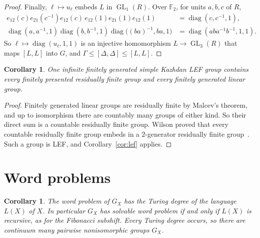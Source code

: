 \documentclass[11pt]{amsart}
\newtheorem{corollary}[theorem]{Corollary}
\newcommand{\F}{\mathbb F}
\newcommand{\GL}{\operatorname{GL}}
\begin{document}
\begin{proof}
Finally, $\ell\mapsto u_\ell$ embeds $L$ in $\GL_1(R)$. Over $\F_2$, for
units $a,b,c$ of $R$,
\[
 \begin{aligned}
 e_{12}(c)e_{21}(c^{-1})e_{12}(c)\,e_{12}(1)e_{21}(1)e_{12}(1)
 &=\operatorname{diag}(c,c^{-1},1),\\
 \operatorname{diag}(a,a^{-1},1)\operatorname{diag}(b,b^{-1},1)
 \operatorname{diag}\bigl((ba)^{-1},ba,1\bigr)
 &=\operatorname{diag}(aba^{-1}b^{-1},1,1).
 \end{aligned}
\]
So $\ell\mapsto\operatorname{diag}(u_\ell,1,1)$ is an injective
homomorphism $L\to\GL_3(R)$ that maps $[L,L]$ into $G$, and
$\Gamma\le[\Delta,\Delta]\le[L,L]$.
\end{proof}

\begin{corollary}
One infinite finitely generated simple Kazhdan LEF group contains every
finitely presented residually finite group and every finitely generated
linear group.
\end{corollary}

\begin{proof}
Finitely generated linear groups are residually finite by Malcev's
theorem, and up to isomorphism there are countably many groups of either
kind. So their direct sum is a countable residually finite group. Wilson
proved that every countable residually finite group embeds in a
$2$-generator residually finite group~\cite[Theorem~A]{Wilson}. Such a
group is LEF, and Corollary~\ref{cor:lef} applies.
\end{proof}

\section{Word problems}

\begin{corollary}
The word problem of $G_X$ has the Turing degree of the language $L(X)$
of $X$. In particular $G_X$ has solvable word problem if and only if
$L(X)$ is recursive, as for the Fibonacci subshift. Every Turing degree
occurs, so there are continuum many pairwise nonisomorphic groups $G_X$.
\end{corollary}
\end{document}
